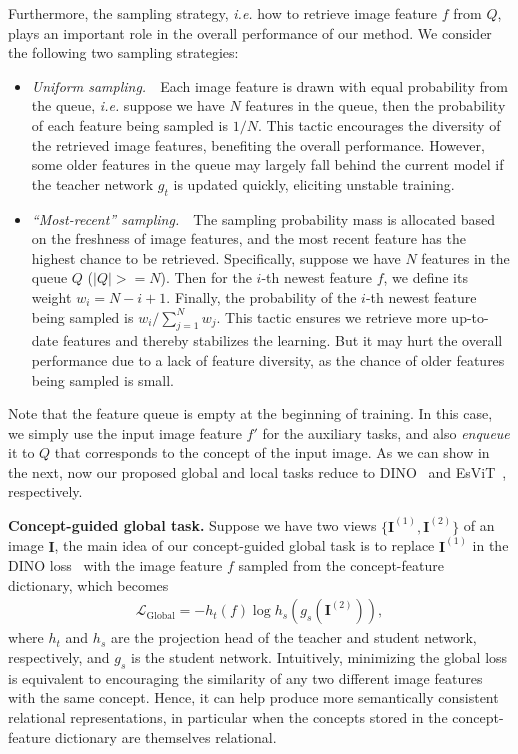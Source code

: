 \documentclass{article} \usepackage{iclr2022_conference,times}
\renewcommand{\paragraph}[1]{\noindent\textbf{#1.}}
\newcommand{\image}{\mathbf{I}}
\newcommand{\loss}{\mathcal{L}}
\begin{document}
Furthermore, the sampling strategy, \emph{i.e.} how to retrieve image feature $f$ from $Q$, plays an important role in the overall performance of our method. We consider the following two sampling strategies:
\setlength{\leftmargini}{1.5em}
\begin{itemize}[noitemsep,topsep=0pt]
    \item \textit{Uniform sampling.}~~Each image feature is drawn with equal probability from the queue, \emph{i.e.} suppose we have $N$ features in the queue, then the probability of each feature being sampled is $1/N$. This tactic encourages the diversity of the retrieved image features, benefiting the overall performance. However, some older features in the queue may largely fall behind the current model if the teacher network $g_t$ is updated quickly, eliciting unstable training.
    \vspace{3pt}
    \item \textit{``Most-recent'' sampling.}~~The sampling probability mass is allocated based on the freshness of image features, and the most recent feature has the highest chance to be retrieved. Specifically, suppose we have $N$ features in the queue $Q$ ($|Q|>=N$). Then for the $i$-th newest feature $f$, we define its weight $w_i = N-i+1$. Finally, the probability of the $i$-th newest feature being sampled is $w_i/\sum_{j=1}^N w_j$. This tactic ensures we retrieve more up-to-date features and thereby stabilizes the learning. But it may hurt the overall performance due to a lack of feature diversity, as the chance of older features being sampled is small.
\end{itemize}
Note that the feature queue is empty at the beginning of training. In this case, we simply use the input image feature $f'$ for the auxiliary tasks, and also \emph{enqueue} it to $Q$ that corresponds to the concept of the input image.
As we can show in the next, now our proposed global and local tasks reduce to DINO~\citep{dino} and EsViT~\citep{esvit}, respectively. 

\paragraph{Concept-guided global task}
Suppose we have two views $\{\image^{(1)}, \image^{(2)}\}$ of an image $\image$, 
the main idea of our concept-guided global task is to replace $\image^{(1)}$ in the DINO loss~\citep{dino} with the image feature $f$ sampled from the concept-feature dictionary, which becomes
\vskip -0.25in
\begin{align}
    \loss_{\operatorname{Global}} = -h_t(f) \log h_s(g_s(\image^{(2)})),
\end{align}
\vskip -0.15in
where $h_t$ and $h_s$ are the projection head of the teacher and student network, respectively, and $g_s$ is the student network. Intuitively, minimizing the global loss is equivalent to encouraging the similarity of any two different image features with the same concept. Hence, it can help produce more semantically consistent relational representations, in particular when the concepts stored in the concept-feature dictionary are themselves relational. 
\end{document}
